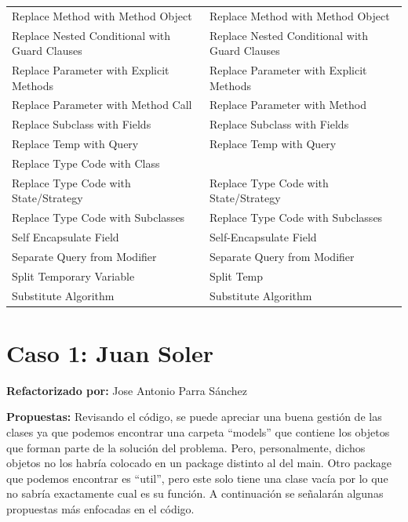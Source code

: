 \documentclass[11pt,a4paper,oneside]{book}
\begin{document}
\begin{longtable}{|p{200pt}|p{200pt}|}
    Replace Method with Method Object & Replace Method with Method Object\\ 
    Replace Nested Conditional with Guard Clauses & Replace Nested Conditional with Guard Clauses\\ 
    Replace Parameter with Explicit Methods & Replace Parameter with Explicit Methods\\ 
    Replace Parameter with Method Call & Replace Parameter with Method\\ 
    Replace Subclass with Fields & Replace Subclass with Fields\\ 
    Replace Temp with Query & Replace Temp with Query\\ 
    Replace Type Code with Class & \\ 
    Replace Type Code with State/Strategy & Replace Type Code with State/Strategy\\ 
    Replace Type Code with Subclasses & Replace Type Code with Subclasses\\ 
    Self Encapsulate Field & Self-Encapsulate Field\\ 
    Separate Query from Modifier & Separate Query from Modifier\\ 
    Split Temporary Variable & Split Temp\\ 
    Substitute Algorithm &     Substitute Algorithm\\
\end{longtable}





\chapter{Caso 1: Juan Soler}
 \textbf{Refactorizado por:} Jose Antonio Parra Sánchez \newline

\textbf{Propuestas: } Revisando el código, se puede apreciar una buena gestión de las clases ya que podemos encontrar una carpeta ``models'' que contiene los objetos que forman parte de la solución del problema. Pero, personalmente, dichos objetos no los habría colocado en un package distinto al del main. Otro package que podemos encontrar es ``util'', pero este solo tiene una clase vacía por lo que no sabría exactamente cual es su función. A continuación se señalarán algunas propuestas más enfocadas en el código.
\end{document}
